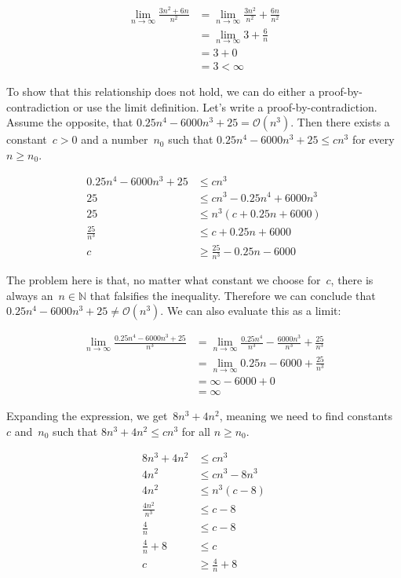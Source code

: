 \begin{align*}
  \lim_{n \to \infty} \frac{3n^2 + 6n}{n^2} &= \lim_{n \to \infty} \frac{3n^2}{n^2} + \frac{6n}{n^2}\\
  &= \lim_{n \to \infty} 3 + \frac{6}{n}\\
  &= 3 + 0\\
  &= 3 < \infty
\end{align*}

To show that this relationship does not hold, we can do either a proof-by-contradiction or use the limit definition. 
Let's write a proof-by-contradiction. 
Assume the opposite, that $0.25n^4 - 6000n^3 + 25 = \mathcal{O}(n^3)$. 
Then there exists a constant~$c > 0$ and a number~$n_0$ such that $0.25n^4 - 6000n^3 + 25 \leq cn^3$ for every~$n \geq n_0$.

\begin{align*}
  0.25n^4 - 6000n^3 + 25 &\leq cn^3\\
  25 &\leq cn^3 - 0.25n^4 + 6000n^3\\
  25 &\leq n^3(c + 0.25n + 6000)\\
  \frac{25}{n^3} &\leq c + 0.25n + 6000\\
  c &\geq \frac{25}{n^3} - 0.25n - 6000
\end{align*}

The problem here is that, no matter what constant we choose for~$c$, there is always an~$n\in\mathbb{N}$ that falsifies the inequality. 
Therefore we can conclude that $0.25n^4 - 6000n^3 + 25 \neq \mathcal{O}(n^3)$. 
We can also evaluate this as a limit:

\begin{align*}
  \lim_{n \to \infty} \frac{0.25n^4 - 6000n^3 + 25}{n^3} &= \lim_{n \to \infty} \frac{0.25n^4}{n^3} - \frac{6000n^3}{n^3} + \frac{25}{n^3}\\
  &= \lim_{n \to \infty} 0.25n - 6000 + \frac{25}{n^3}\\
  &= \infty - 6000 + 0\\
  &= \infty
\end{align*}

Expanding the expression, we get~$8n^3 + 4n^2$, meaning we need to find constants~$c$ and~$n_0$ such that $8n^3 + 4n^2 \leq cn^3$ for all $n\geq n_0$.

\begin{align*}
  8n^3 + 4n^2 &\leq cn^3\\
  4n^2 &\leq cn^3 - 8n^3\\
  4n^2 &\leq n^3(c - 8)\\
  \frac{4n^2}{n^3} &\leq c - 8\\
  \frac{4}{n} &\leq c - 8\\
  \frac{4}{n} + 8 &\leq c\\
  c &\geq \frac{4}{n} + 8
\end{align*}

